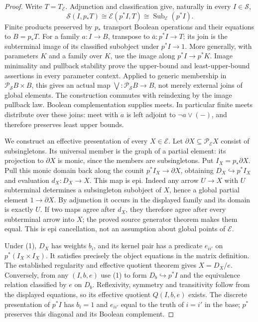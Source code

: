 \begin{proof}
Write \(T=T_{\mathcal E}\). Adjunction and classification give,
naturally in every \(I\in\mathcal S\),
\[
 \mathcal S(I,p_*T)\cong\mathcal E(p^*I,T)
              \cong\operatorname{Sub}_{\mathcal E}(p^*I).
\tag{1}
\]
Finite products preserved by \(p_*\) transport Boolean operations
and their equations to \(B=p_*T\). For a family \(a:I\to B\),
transpose to \(\bar a:p^*I\to T\); its join is the subterminal
image of its classified subobject under \(p^*I\to1\). More
generally, with parameters \(K\) and a family over \(K\), use
the image along \(p^*I\to p^*K\). Image minimality and pullback
stability prove the upper-bound and least-upper-bound assertions in
every parameter context. Applied to generic membership in
\(\mathcal P_{\mathcal S}B\times B\), this gives an actual
map \(\bigvee:\mathcal P_{\mathcal S}B\to B\), not merely
external joins of global elements. The construction commutes with
reindexing by the image pullback law. Boolean complementation supplies
meets. In particular finite meets distribute over these joins: meet
with \(a\) is left adjoint to \(\neg a\vee(-)\), and therefore
preserves least upper bounds.

We construct an effective presentation of every \(X\in\mathcal E\).
Let \(\partial X\subseteq\mathcal P_{\mathcal E}X\) consist of
subsingletons. Its universal member is the graph of a partial element:
its projection to \(\partial X\) is monic, since the members are
subsingletons. Put \(I_X=p_*\partial X\). Pull this monic
domain back along the counit \(p^*I_X\to\partial X\), obtaining
\(D_X\hookrightarrow p^*I_X\) and evaluation \(d_X:D_X\to X\).
This map is epi. Indeed any arrow \(U\to X\) with \(U\)
subterminal determines a subsingleton subobject of \(X\), hence a
global partial element \(1\to\partial X\). By adjunction it
occurs in the displayed family and its domain is exactly \(U\).
If two maps agree after \(d_X\), they therefore agree after every
subterminal arrow into \(X\); the proved source generator theorem
makes them equal. This is epi cancellation, not an assumption about
global points of \(\mathcal E\).

Under (1), \(D_X\) has weights \(b_i\), and its kernel pair
has a predicate \(e_{ii'}\) on \(p^*(I_X\times I_X)\).
It satisfies precisely the object equations in the matrix definition.
The established regularity and effective quotient theorem gives
\(X=D_X/e\). Conversely, from any \((I,b,e)\) use (1) to form
\(D_b\hookrightarrow p^*I\) and the equivalence relation classified
by \(e\) on \(D_b\). Reflexivity, symmetry and transitivity follow
from the displayed equations, so its effective quotient \(Q(I,b,e)\)
exists. The discrete presentation of \(p^*I\) has \(b_i=1\)
and \(e_{ii'}\) equal to the truth of \(i=i'\) in the base;
\(p^*\) preserves this diagonal and its Boolean complement.


\end{proof}
